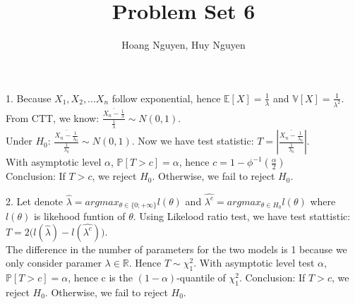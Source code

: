 \documentclass[10pt]{article}
\newenvironment{problem}[2][Problem]{\begin{trivlist}
\item[\hskip \labelsep {\bfseries #1}\hskip \labelsep {\bfseries #2.}]}{\end{trivlist}}
\begin{document}
\title{Problem Set 6}
\author{Hoang Nguyen, Huy Nguyen}
\maketitle
    
\begin{problem}{1}
\item 1.
Because $X_1, X_2,...X_n$ follow exponential, hence $\mathbb{E}[X]=\frac{1}{\lambda}$ and $\mathbb{V}[X]=\frac{1}{\lambda^2}$.\\
From CTT, we know: $\frac{\bar{X_n-\frac{1}{\lambda}}}{\frac{1}{\lambda}} \sim N(0,1)$.\\
Under $H_0$: $\frac{\bar{X_n-\frac{1}{\lambda_0}}}{\frac{1}{\lambda_0}} \sim N(0,1)$. Now we have test statistic: $T= |\frac{\bar{X_n-\frac{1}{\lambda_0}}}{\frac{1}{\lambda_0}}|$.\\
With asymptotic level $\alpha$, $\mathbb{P}[T>c]=\alpha$, hence $c=1-\phi^{-1}(\frac{\alpha}{2})$\\
Conclusion: If $T>c$, we reject $H_0$. Otherwise, we fail to reject $H_0$.


\item 2. 
Let denote $\hat{\lambda}=argmax_{\theta \in \{0; +\infty\}} l(\theta)$ and $\hat{\lambda^c}=argmax_{\theta \in H_0} l(\theta)$ where $l(\theta)$ is likehood funtion of $\theta$. Using Likelood ratio test, we have test stattistic: $T=2\Big(l(\hat{\lambda})-l(\hat{\lambda^c})\Big)$. \\
The difference in the number of parameters for the two models is 1 because we only consider paramer $\lambda \in \mathbb{R}$. Hence $T \sim \chi_{1}^{2}$. With asymptotic level test $\alpha$, $\mathbb{P}[T>c]=\alpha$, hence c is the $(1-\alpha)$-quantile of $\chi^{2}_{1}$.
Conclusion: If $T>c$, we reject $H_0$. Otherwise, we fail to reject $H_0$.


\end{problem}
\end{document}

